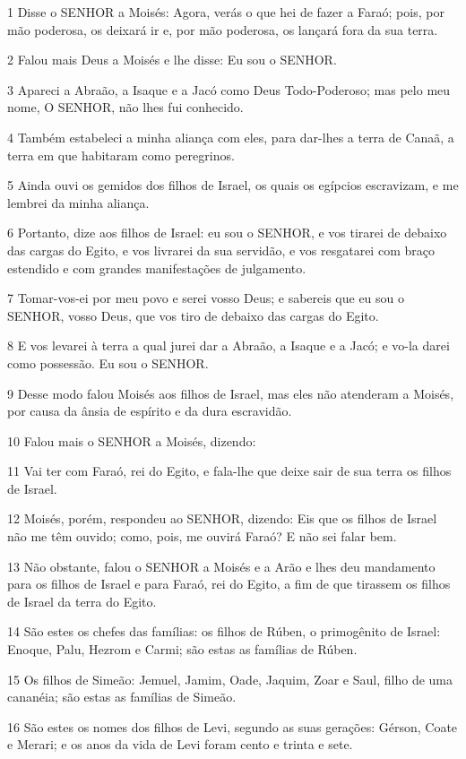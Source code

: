 \par 1 Disse o SENHOR a Moisés: Agora, verás o que hei de fazer a Faraó; pois, por mão poderosa, os deixará ir e, por mão poderosa, os lançará fora da sua terra.
\par 2 Falou mais Deus a Moisés e lhe disse: Eu sou o SENHOR.
\par 3 Apareci a Abraão, a Isaque e a Jacó como Deus Todo-Poderoso; mas pelo meu nome, O SENHOR, não lhes fui conhecido.
\par 4 Também estabeleci a minha aliança com eles, para dar-lhes a terra de Canaã, a terra em que habitaram como peregrinos.
\par 5 Ainda ouvi os gemidos dos filhos de Israel, os quais os egípcios escravizam, e me lembrei da minha aliança.
\par 6 Portanto, dize aos filhos de Israel: eu sou o SENHOR, e vos tirarei de debaixo das cargas do Egito, e vos livrarei da sua servidão, e vos resgatarei com braço estendido e com grandes manifestações de julgamento.
\par 7 Tomar-vos-ei por meu povo e serei vosso Deus; e sabereis que eu sou o SENHOR, vosso Deus, que vos tiro de debaixo das cargas do Egito.
\par 8 E vos levarei à terra a qual jurei dar a Abraão, a Isaque e a Jacó; e vo-la darei como possessão. Eu sou o SENHOR.
\par 9 Desse modo falou Moisés aos filhos de Israel, mas eles não atenderam a Moisés, por causa da ânsia de espírito e da dura escravidão.
\par 10 Falou mais o SENHOR a Moisés, dizendo:
\par 11 Vai ter com Faraó, rei do Egito, e fala-lhe que deixe sair de sua terra os filhos de Israel.
\par 12 Moisés, porém, respondeu ao SENHOR, dizendo: Eis que os filhos de Israel não me têm ouvido; como, pois, me ouvirá Faraó? E não sei falar bem.
\par 13 Não obstante, falou o SENHOR a Moisés e a Arão e lhes deu mandamento para os filhos de Israel e para Faraó, rei do Egito, a fim de que tirassem os filhos de Israel da terra do Egito.
\par 14 São estes os chefes das famílias: os filhos de Rúben, o primogênito de Israel: Enoque, Palu, Hezrom e Carmi; são estas as famílias de Rúben.
\par 15 Os filhos de Simeão: Jemuel, Jamim, Oade, Jaquim, Zoar e Saul, filho de uma cananéia; são estas as famílias de Simeão.
\par 16 São estes os nomes dos filhos de Levi, segundo as suas gerações: Gérson, Coate e Merari; e os anos da vida de Levi foram cento e trinta e sete.
